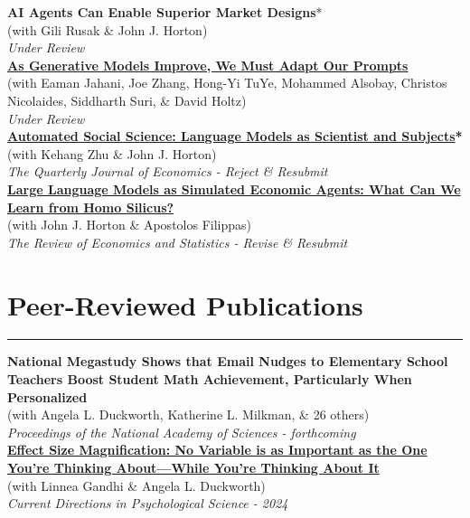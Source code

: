\documentclass[11.25pt]{article}
\begin{document}
\noindent\textbf{AI Agents Can Enable Superior Market Designs}*\\ 
(with Gili Rusak \& John J. Horton)\\
\textit{Under Review}\\

\noindent\textbf{\href{https://arxiv.org/abs/2407.14333}{As Generative Models Improve, We Must Adapt Our Prompts}} \\ (with Eaman Jahani, Joe Zhang, Hong-Yi TuYe, Mohammed Alsobay, Christos Nicolaides, Siddharth
Suri, \& David Holtz)\\
\textit{Under Review}\\

\noindent\textbf{\href{https://www.nber.org/papers/w32381}{Automated Social Science: Language Models as Scientist and Subjects}*}\\ 
(with Kehang Zhu \& John J. Horton)\\
\textit{The Quarterly Journal of Economics - Reject \& Resubmit}\\

\noindent\href{https://www.nber.org/papers/w31122}{\textbf{Large Language Models as Simulated Economic Agents: What Can We Learn from Homo Silicus?}} \\ (with John J. Horton \& Apostolos Filippas) \\
\textit{The Review of Economics and Statistics - Revise \& Resubmit}\\

\section*{Peer-Reviewed Publications} \vspace{-1mm} \hrule
\vspace{3mm}

\noindent \textbf{National Megastudy Shows that Email Nudges to Elementary School Teachers Boost Student Math Achievement, Particularly When Personalized} \\
(with Angela L. Duckworth, Katherine L. Milkman, \& 26 others) \\
\textit{Proceedings of the National Academy of Sciences - forthcoming}\\

\noindent \textbf{\href{https://journals.sagepub.com/doi/full/10.1177/09637214241268222}{Effect Size Magnification: No Variable is as Important as the One You’re Thinking About—While You’re Thinking About It}} \\
(with Linnea Gandhi \& Angela L. Duckworth)\\
\textit{Current Directions in Psychological Science - 2024}
\end{document}
